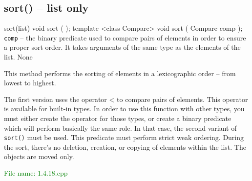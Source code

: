 
\subsection{sort() – list only} %
\begin{methodinfo}
  {sort(list)}
  {void sort ( ); 
  template <class Compare> 
    void sort ( Compare comp );}
  {\texttt{comp} – the binary predicate used to compare pairs of elements in order to ensure a proper sort order. 
  It takes arguments of the same type as the elements of the list.}
  {None}
  {This method performs the sorting of elements in a lexicographic order – from lowest to highest.

  The first version uses the operator < to compare pairs of elements. This operator is available for 
  built-in types. In order to use this function with other types, you must either create the operator for 
  those types, or create a binary predicate which will perform basically the same role. In that case, 
  the second variant of \texttt{sort()} must be used. This predicate must perform strict weak ordering. 
  During the sort, there’s no deletion, creation, or copying of elements within the list. The objects are 
  moved only.}
\end{methodinfo}
\textcolor{green}{File name: 1.4.18.cpp}

